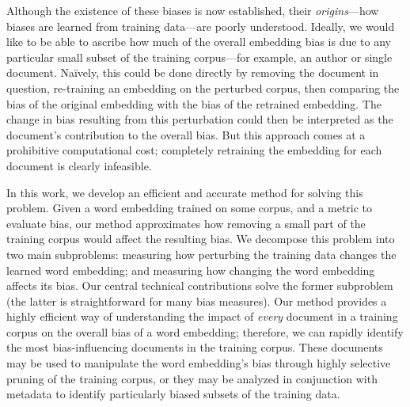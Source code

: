 \documentclass{article}
\begin{document}
Although the existence of these biases is now established, their \emph{origins}---how biases are learned from training data---are poorly understood. 
Ideally, we would like to be able to ascribe how much of the overall embedding bias is due to any particular small subset of the training corpus---for example, an author or single document. 
Na{\"i}vely, this could be done directly by removing the document in question, re-training an embedding on the perturbed corpus, then comparing the bias of the original embedding with the bias of the retrained embedding. 
The change in bias resulting from this perturbation could then be interpreted as the document's contribution to the overall bias.
But this approach comes at a prohibitive computational cost; completely retraining the embedding for each document is clearly infeasible.

In this work, we develop an efficient and accurate method for solving this problem. 
%
Given a word embedding trained on some corpus, and a metric to evaluate bias, our method approximates how removing a small part of the training corpus would affect the resulting bias.
We decompose this problem into two main subproblems: measuring how perturbing the training data changes the learned word embedding; and measuring how changing the word embedding affects its bias. 
Our central technical contributions solve the former subproblem (the latter is straightforward for many bias measures). 
Our method provides a highly efficient way of understanding the impact of \textit{every} document in a training corpus on the overall bias of a word embedding; therefore, we can rapidly identify the most bias-influencing documents in the training corpus. 
These documents may be used to manipulate the word embedding's bias through highly selective pruning of the training corpus, or they may be analyzed in conjunction with metadata to identify particularly biased subsets of the training data.
\end{document}
